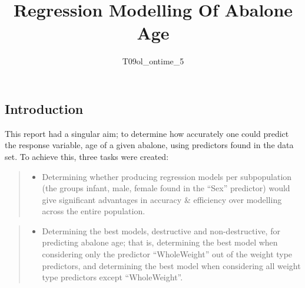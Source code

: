 \documentclass[letterpaper,9pt,twocolumn,twoside,]{pinp}
\title{Regression Modelling Of Abalone Age}
\author[]{T09ol\_ontime\_5}
\providecommand{\tightlist}{%
  \setlength{\itemsep}{0pt}\setlength{\parskip}{0pt}}
\begin{document}
\verticaladjustment{-2pt}

\maketitle
\thispagestyle{firststyle}



\begin{Shaded}
\begin{Highlighting}[]
\NormalTok{(}\NormalTok{)}
\NormalTok{(}\NormalTok{)}
\NormalTok{(}\NormalTok{)}
\end{Highlighting}
\end{Shaded}

\hypertarget{introduction}{%
\subsection{Introduction}\label{introduction}}

This report had a singular aim; to determine how accurately one could
predict the response variable, age of a given abalone, using predictors
found in the data set. To achieve this, three tasks were created:

\begin{quote}
\begin{itemize}
\tightlist
\item
  Determining whether producing regression models per subpopulation (the
  groups infant, male, female found in the ``Sex'' predictor) would give
  significant advantages in accuracy \& efficiency over modelling across
  the entire population.
\end{itemize}
\end{quote}

\begin{quote}
\begin{itemize}
\tightlist
\item
  Determining the best models, destructive and non-destructive, for
  predicting abalone age; that is, determining the best model when
  considering only the predictor ``WholeWeight'' out of the weight type
  predictors, and determining the best model when considering all weight
  type predictors except ``WholeWeight''.
\end{itemize}
\end{quote}
\end{document}
